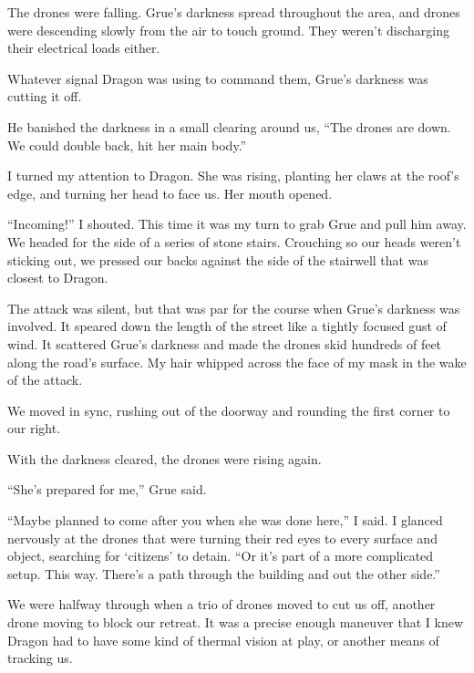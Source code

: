 The drones were falling.  Grue's darkness spread throughout the area, and drones were descending slowly from the air to touch ground.  They weren't discharging their electrical loads either.



Whatever signal Dragon was using to command them, Grue's darkness was cutting it off.



He banished the darkness in a small clearing around us, ``The drones are down.  We could double back, hit her main body.''



I turned my attention to Dragon.  She was rising, planting her claws at the roof's edge, and turning her head to face us.  Her mouth opened.



``Incoming!''  I shouted.  This time it was my turn to grab Grue and pull him away.  We headed for the side of a series of stone stairs.  Crouching so our heads weren't sticking out, we pressed our backs against the side of the stairwell that was closest to Dragon.



The attack was silent, but that was par for the course when Grue's darkness was involved.  It speared down the length of the street like a tightly focused gust of wind.  It scattered Grue's darkness and made the drones skid hundreds of feet along the road's surface.  My hair whipped across the face of my mask in the wake of the attack.



We moved in sync, rushing out of the doorway and rounding the first corner to our right.



With the darkness cleared, the drones were rising again.



``She's prepared for me,'' Grue said.



``Maybe planned to come after you when she was done here,'' I said.  I glanced nervously at the drones that were turning their red eyes to every surface and object, searching for `citizens' to detain.  ``Or it's part of a more complicated setup.  This way.  There's a path through the building and out the other side.''



We were halfway through when a trio of drones moved to cut us off, another drone moving to block our retreat.  It was a precise enough maneuver that I knew Dragon had to have some kind of thermal vision at play, or another means of tracking us.



